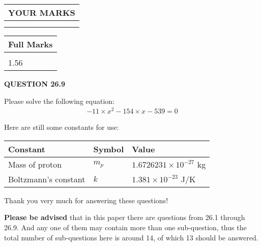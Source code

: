 \documentclass[12pt]{article}
\begin{document}
 

 
\vspace{0.3in}
  
\vspace{0.2in}
  
\noindent\begin{tabular}{|l|}
\hline
 YOUR MARKS  \\
\hline
 \\ 
 \\ 
\hline
\end{tabular}
\hspace{0.05in} \begin{tabular}{|l|}
\hline
 Full Marks  \\
\hline
 \\ 
1.56 \\
\hline
\end{tabular}
{\textbf{\Large{QUESTION
26.9 
}}}
  
  
 
 

 
Please solve the following equation:
\begin{eqnarray*}
-11 \times x^2  %
-154
                 \times x    %
-539 =0
\end{eqnarray*}
 

 

 
\vspace{0.3in}
   
   
 \vspace{0.2in}
Here are still some constants for use:
 
 
\noindent\begin{tabular}{|l|l|l|}
\hline
Constant & Symbol & Value \\
\hline
 
Mass of proton &
$m_p$ &
 $ 1.6726231 \times 10^{-27} $
kg \\
\hline
 
Boltzmann's constant &
$k$ &
 $ 1.381 \times 10^{-23} $
J/K \\
\hline
 
\end{tabular}
 
Thank you very much for answering these questions!
 
{\textbf{\large{Please be advised}}} that in this paper there are questions from
26.1 through
26.9.
And any one of them may contain more than one sub-question, thus the total number
of sub-questions here is around 14, of which
13 should be answered.
 
\end{document}
